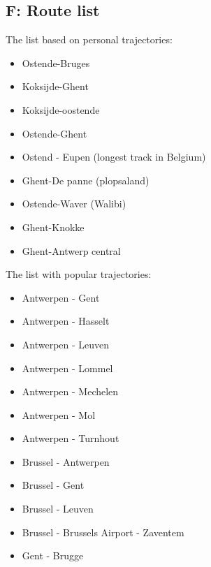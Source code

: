 \begin{appendices}
\section*{F: Route list}
\label{app:routelist}
The list based on personal trajectories:
\begin{itemize}%
    \item Ostende-Bruges 
    \item Koksijde-Ghent %
    \item Koksijde-oostende %
    \item Ostende-Ghent %
    \item Ostend - Eupen (longest track in Belgium)
    \item Ghent-De panne (plopsaland) %
    \item Ostende-Waver (Walibi) %
    \item Ghent-Knokke %
    \item Ghent-Antwerp central %
\end{itemize}
The list with popular trajectories:
\begin{itemize}
    \item Antwerpen - Gent
    \item Antwerpen - Hasselt
    \item Antwerpen - Leuven
    \item Antwerpen - Lommel
    \item Antwerpen - Mechelen
    \item Antwerpen - Mol
    \item Antwerpen - Turnhout
    \item Brussel - Antwerpen
    \item Brussel - Gent
    \item Brussel - Leuven
    \item Brussel - Brussels Airport - Zaventem
    \item Gent - Brugge 
\end{itemize}

\end{appendices}